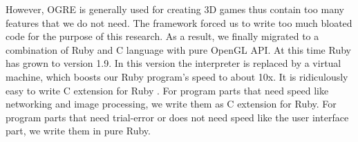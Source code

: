 However, OGRE is generally used for creating 3D games thus contain too many features that we do not need. The framework forced us to write too much bloated code for the purpose of this research. As a result, we finally migrated to a combination of Ruby and C language with pure OpenGL API. At this time Ruby has grown to version 1.9. In this version the interpreter is replaced by a virtual machine, which boosts our Ruby program's speed to about 10x. It is ridiculously easy to write C extension for Ruby \citep{Reference15}. For program parts that need speed like networking and image processing, we write them as C extension for Ruby. For program parts that need trial-error or does not need speed like the user interface part, we write them in pure Ruby.
